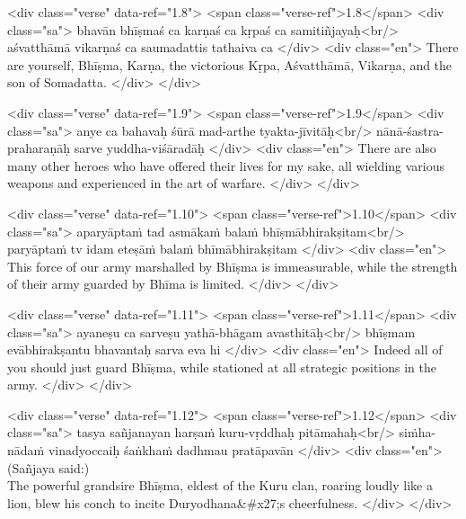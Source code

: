 \begin{html}
<div class="verse" data-ref="1.8">
  <span class="verse-ref">1.8</span>
  <div class="sa">
    bhavān bhīṣmaś ca karṇaś ca kṛpaś ca samitiñjayaḥ<br/>
    aśvatthāmā vikarṇaś ca saumadattis tathaiva ca
  </div>
  <div class="en">
    There are yourself, Bhīṣma, Karṇa, the victorious Kṛpa, Aśvatthāmā, Vikarṇa, and the son of Somadatta.
  </div>
</div>
\end{html}



\begin{html}
<div class="verse" data-ref="1.9">
  <span class="verse-ref">1.9</span>
  <div class="sa">
    anye ca bahavaḥ śūrā mad-arthe tyakta-jīvitāḥ<br/>
    nānā-śastra-praharaṇāḥ sarve yuddha-viśāradāḥ
  </div>
  <div class="en">
    There are also many other heroes who have offered their lives for my sake, all wielding various weapons and experienced in the art of warfare.
  </div>
</div>
\end{html}



\begin{html}
<div class="verse" data-ref="1.10">
  <span class="verse-ref">1.10</span>
  <div class="sa">
    aparyāptaṁ tad asmākaṁ balaṁ bhīṣmābhirakṣitam<br/>
    paryāptaṁ tv idam eteṣāṁ balaṁ bhīmābhirakṣitam
  </div>
  <div class="en">
    This force of our army marshalled by Bhīṣma is immeasurable, while the strength of their army guarded by Bhīma is limited.
  </div>
</div>
\end{html}



\begin{html}
<div class="verse" data-ref="1.11">
  <span class="verse-ref">1.11</span>
  <div class="sa">
    ayaneṣu ca sarveṣu yathā-bhāgam avasthitāḥ<br/>
    bhīṣmam evābhirakṣantu bhavantaḥ sarva eva hi
  </div>
  <div class="en">
    Indeed all of you should just guard Bhīṣma, while stationed at all strategic positions in the army.
  </div>
</div>
\end{html}



\begin{html}
<div class="verse" data-ref="1.12">
  <span class="verse-ref">1.12</span>
  <div class="sa">
    tasya sañjanayan harṣaṁ kuru-vṛddhaḥ pitāmahaḥ<br/>
    siṁha-nādaṁ vinadyoccaiḥ śaṅkhaṁ dadhmau pratāpavān
  </div>
  <div class="en">
    \hspace*{1em}(Sañjaya said:) \\ The powerful grandsire Bhīṣma, eldest of the Kuru clan, roaring loudly like a lion, blew his conch to incite Duryodhana&#x27;s cheerfulness.
  </div>
</div>
\end{html}



